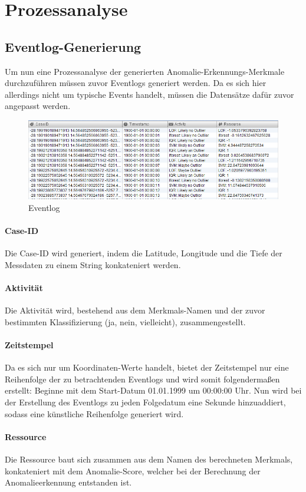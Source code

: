 \section{Prozessanalyse}
\subsection{Eventlog-Generierung}
Um nun eine Prozessanalyse der generierten Anomalie-Erkennungs-Merkmale durchzuführen müssen zuvor Eventlogs generiert werden. Da es sich hier allerdings nicht um typische Events handelt, müssen die Datensätze dafür zuvor angepasst werden.

\begin{figure}[h!]
	\includegraphics[width=\textwidth]{img/eventlog.png}
	\caption[Eventlog]{Eventlog}
	\label{fig:eventlog}
\end{figure}
 
\paragraph{Case-ID} 
Die Case-ID wird generiert, indem die Latitude, Longitude und die Tiefe der Messdaten zu einem String konkateniert werden. 
\paragraph{Aktivität}
Die Aktivität wird, bestehend aus dem Merkmals-Namen und der zuvor bestimmten Klassifizierung (ja, nein, vielleicht), zusammengestellt. 
\paragraph{Zeitstempel}
Da es sich nur um Koordinaten-Werte handelt, bietet der Zeitstempel nur eine Reihenfolge der zu betrachtenden Eventlogs und wird somit folgendermaßen erstellt: Beginne mit dem Start-Datum 01.01.1999 um 00:00:00 Uhr. Nun wird bei der Erstellung des Eventlogs zu jeden Folgedatum eine Sekunde hinzuaddiert, sodass eine künstliche Reihenfolge generiert wird.
\paragraph{Ressource}
Die Ressource baut sich zusammen aus dem Namen des berechneten Merkmals, konkateniert mit dem Anomalie-Score, welcher bei der Berechnung der Anomalieerkennung entstanden ist.

